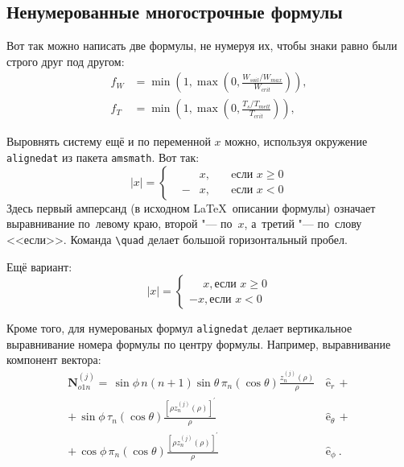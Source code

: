 \subsection{Ненумерованные многострочные формулы} \label{subsect1_3_2}

Вот так можно написать две формулы, не нумеруя их, чтобы знаки равно были строго друг под другом:
\begin{align}
  f_W & =  \min \left( 1, \max \left( 0, \frac{W_{soil} / W_{max}}{W_{crit}} \right)  \right), \nonumber \\
  f_T & =  \min \left( 1, \max \left( 0, \frac{T_s / T_{melt}}{T_{crit}} \right)  \right), \nonumber
\end{align}

Выровнять систему ещё и по переменной $ x $ можно, используя окружение \verb|alignedat| из пакета \verb|amsmath|. Вот так: 
\[
    |x| = \left\{
    \begin{alignedat}{2}
        &&x, \quad &\text{eсли } x\geqslant 0 \\
        &-&x, \quad & \text{eсли } x<0
    \end{alignedat}
    \right.
\]
Здесь первый амперсанд (в исходном \LaTeX\ описании формулы) означает выравнивание по~левому краю, второй "--- по~$ x $, а~третий "--- по~слову <<если>>. Команда \verb|\quad| делает большой горизонтальный пробел.

Ещё вариант:
\[
    |x|=
    \begin{cases}
    \phantom{-}x, \text{если } x \geqslant 0 \\
    -x, \text{если } x<0
    \end{cases}
\]

Кроме того, для  нумерованых формул \verb|alignedat|  делает вертикальное
выравнивание номера формулы по центру формулы. Например,  выравнивание компонент вектора:
\begin{equation}
 \label{eq:2p3}
 \begin{alignedat}{2}
{\mathbf{N}}_{o1n}^{(j)} = \,{\sin} \phi\,n\!\left(n+1\right)
         {\sin}\theta\,
         \pi_n\!\left({\cos} \theta\right)
         \frac{
               z_n^{(j)}\!\left( \rho \right)
              }{\rho}\,
           &{\boldsymbol{\hat{\mathrm e}}}_{r}\,+   \\
+\,
{\sin} \phi\,
         \tau_n\!\left({\cos} \theta\right)
         \frac{
            \left[\rho z_n^{(j)}\!\left( \rho \right)\right]^{\prime}
              }{\rho}\,
            &{\boldsymbol{\hat{\mathrm e}}}_{\theta}\,+   \\
+\,
{\cos} \phi\,
         \pi_n\!\left({\cos} \theta\right)
         \frac{
            \left[\rho z_n^{(j)}\!\left( \rho \right)\right]^{\prime}
              }{\rho}\,
            &{\boldsymbol{\hat{\mathrm e}}}_{\phi}\:.
\end{alignedat}
\end{equation}

